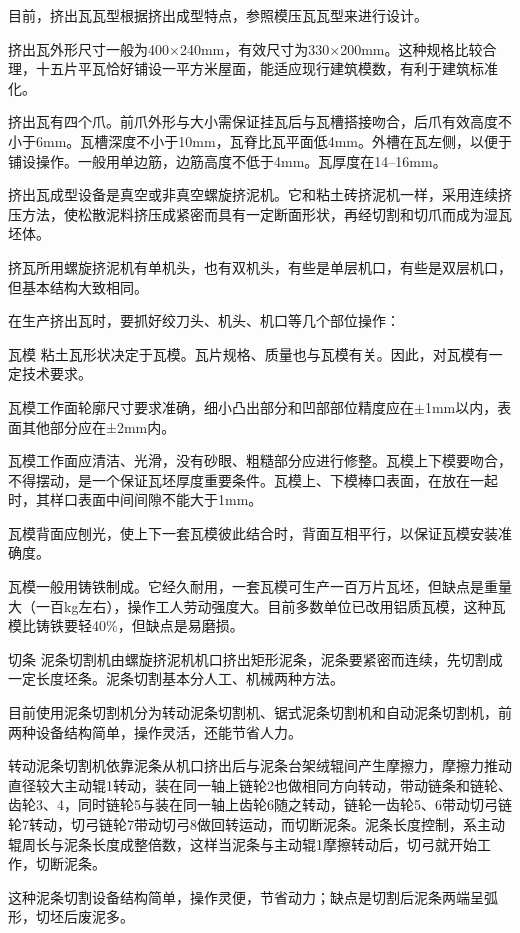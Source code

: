 \documentclass{ctexbook}
\begin{document}
目前，挤出瓦瓦型根据挤出成型特点，参照模压瓦瓦型来进行设计。

挤出瓦外形尺寸一般为400$\times$240mm，有效尺寸为330$\times$200mm。这种规格比较合理，十五片平瓦恰好铺设一平方米屋面，能适应现行建筑模数，有利于建筑标准化。

挤出瓦有四个爪。前爪外形与大小需保证挂瓦后与瓦槽搭接吻合，后爪有效高度不小于6mm。瓦槽深度不小于10mm，瓦脊比瓦平面低4mm。外槽在瓦左侧，以便于铺设操作。一般用单边筋，边筋高度不低于4mm。瓦厚度在14--16mm。

挤出瓦成型设备是真空或非真空螺旋挤泥机。它和粘土砖挤泥机一样，采用连续挤压方法，使松散泥料挤压成紧密而具有一定断面形状，再经切割和切爪而成为湿瓦坯体。

挤瓦所用螺旋挤泥机有单机头，也有双机头，有些是单层机口，有些是双层机口，但基本结构大致相同。

在生产挤出瓦时，要抓好绞刀头、机头、机口等几个部位操作：

瓦模 粘土瓦形状决定于瓦模。瓦片规格、质量也与瓦模有关。因此，对瓦模有一定技术要求。

瓦模工作面轮廓尺寸要求准确，细小凸出部分和凹部部位精度应在$\pm$1mm以内，表面其他部分应在±2mm内。

瓦模工作面应清洁、光滑，没有砂眼、粗糙部分应进行修整。瓦模上下模要吻合，不得摆动，是一个保证瓦坯厚度重要条件。瓦模上、下模棒口表面，在放在一起时，其样口表面中间间隙不能大于1mm。

瓦模背面应刨光，使上下一套瓦模彼此结合时，背面互相平行，以保证瓦模安装准确度。

瓦模一般用铸铁制成。它经久耐用，一套瓦模可生产一百万片瓦坯，但缺点是重量大（一百kg左右），操作工人劳动强度大。目前多数单位已改用铝质瓦模，这种瓦模比铸铁要轻40\%，但缺点是易磨损。

切条 泥条切割机由螺旋挤泥机机口挤出矩形泥条，泥条要紧密而连续，先切割成一定长度坯条。泥条切割基本分人工、机械两种方法。

目前使用泥条切割机分为转动泥条切割机、锯式泥条切割机和自动泥条切割机，前两种设备结构简单，操作灵活，还能节省人力。

转动泥条切割机依靠泥条从机口挤出后与泥条台架绒辊间产生摩擦力，摩擦力推动直径较大主动辊1转动，装在同一轴上链轮2也做相同方向转动，带动链条和链轮、齿轮3、4，同时链轮5与装在同一轴上齿轮6随之转动，链轮一齿轮5、6带动切弓链轮7转动，切弓链轮7带动切弓8做回转运动，而切断泥条。泥条长度控制，系主动辊周长与泥条长度成整倍数，这样当泥条与主动辊1摩擦转动后，切弓就开始工作，切断泥条。

这种泥条切割设备结构简单，操作灵便，节省动力；缺点是切割后泥条两端呈弧形，切坯后废泥多。
\end{document}
